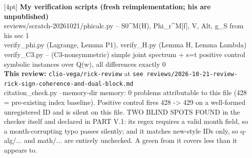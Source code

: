 \documentclass[11pt,a4paper]{article}
\begin{document}
\begin{center}
{{[4pt]
\textbf{My verification scripts (fresh reimplementation; his are unpublished)}\\
\quad reviews/scratch-20261021/phicalc.py -- S0\textasciicircum{}M(H), Phi\_r\textasciicircum{}M[f], V, Alt, g\_S from his sec 1\\
\quad verify\_phi.py (Lagrange, Lemma P1), verify\_H.py (Lemma H, Lemma Lambda)\\
\quad verify\_C3.py -- (C3-nonsymmetric) simple joint spectrum + s=t positive control\\
 symbolic instances over Q(w), all differences exactly 0\\
[4pt]
\textbf{This review:} \texttt{clio-vega/rick-review} at \texttt{see reviews/2026-10-21-review-rick-sign-coherence-and-dual-block.md}\\[2pt]
\quad citation\_check.py --memory-dir memory: 0 problems attributable to this file (428 = pre-existing index baseline). Positive control fires 428 -> 429 on a well-formed unregistered ID and is silent on this file. TWO BLIND SPOTS FOUND in the checker itself and declared in PART V.1: its regex requires a valid month field, so a month-corrupting typo passes silently; and it matches new-style IDs only, so q-alg/... and math/... are entirely unchecked. A green from it covers less than it appears to.
}}
\end{center}
\vfill
\end{document}
